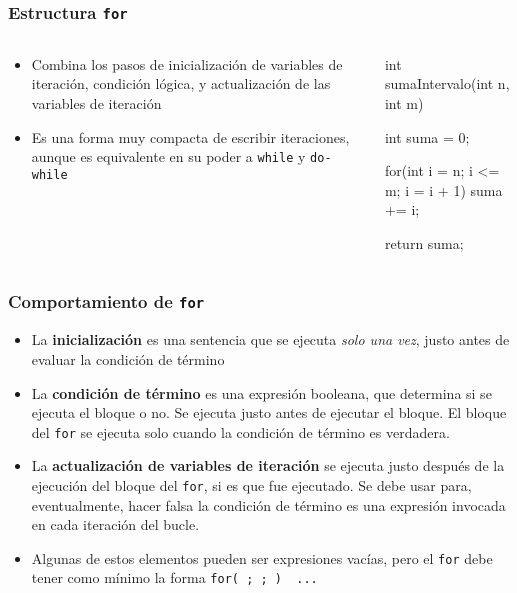 \documentclass{beamer}
\newcommand{\codet}[1]{\texttt{#1}}
\begin{document}
\begin{frame}[fragile]
  \frametitle{Estructura \codet{for}}

      \begin{columns}
    \begin{column}{0.4\textwidth}
      \begin{itemize}
        
      \item Combina los pasos de inicialización de variables de
        iteración, condición lógica, y actualización de las variables
        de iteración
        
      \item Es una forma muy compacta de escribir iteraciones, aunque
        es equivalente en su poder a \codet{while} y \codet{do-while}

      \end{itemize}      
    \end{column}
    \begin{column}{0.6\textwidth}
      \begin{jsmall}
        int sumaIntervalo(int n, int m) {
          int suma = 0;

          for(int i = n; i <= m; i = i + 1) {
            suma += i;
          }
          
          return suma;
        }
      \end{jsmall}
    \end{column}
  \end{columns}

\end{frame}

\begin{frame}[fragile]
  \frametitle{Comportamiento de \codet{for}}

  \begin{itemize}
  \item La \textbf{inicialización} es una sentencia que se ejecuta \emph{solo una vez}, justo antes de evaluar la condición de término

  \item La \textbf{condición de término} es una expresión booleana,
    que determina si se ejecuta el bloque o no. Se ejecuta justo antes
    de ejecutar el bloque. El bloque del \codet{for} se ejecuta solo
    cuando la condición de término es verdadera.    

  \item La \textbf{actualización de variables de iteración} se ejecuta
    justo después de la ejecución del bloque del \codet{for}, si es
    que fue ejecutado. Se debe usar para, eventualmente, hacer falsa
    la condición de término es una expresión invocada en cada iteración del bucle.

  \item Algunas de estos elementos pueden ser expresiones vacías, pero
    el \codet{for} debe tener como mínimo la forma \codet{for( ; ; ) { ... }}
  \end{itemize}
\end{frame}
\end{document}
